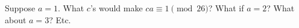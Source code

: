   Suppose $a = 1$. What $c$'s would make $ca \equiv 1 \pmod{26}$?
  What if $a = 2$?
  What about $a = 3$?
  Etc.
